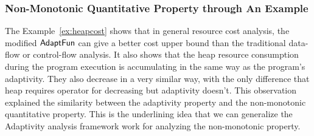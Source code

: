 \subsubsection{Non-Monotonic Quantitative Property through An Example}
\label{sec:nonmonotonic-example}
The Example~\ref{ex:heapcost} shows that in general 
resource cost analysis, the modified $\textsf{AdaptFun}$  can give a better cost upper bound than the traditional 
data-flow or control-flow analysis. It also shows that the heap resource consumption during the program 
execution is accumulating in the same way as the program's adaptivity. 
They also decrease in a very similar way,
with the only difference that heap requires operator for decreasing but adaptivity doesn't.
This observation explained the similarity between
the adaptivity property and the non-monotonic quantitative property. This is the underlining idea that we can generalize the Adaptivity analysis framework work for analyzing the non-monotonic property.



